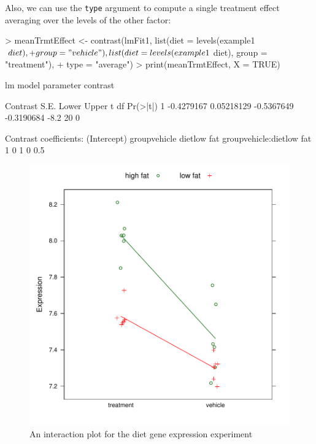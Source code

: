 \documentclass[12pt]{article}
\begin{document}
Also, we can use the \texttt{type} argument to compute a single treatment effect averaging over the levels of the other factor:

{\small
\begin{Schunk}
\begin{Sinput}
> meanTrmtEffect <- contrast(lmFit1, list(diet = levels(example1$diet), 
+     group = "vehicle"), list(diet = levels(example1$diet), group = "treatment"), 
+     type = "average")
> print(meanTrmtEffect, X = TRUE)
\end{Sinput}
\begin{Soutput}
lm model parameter contrast

    Contrast       S.E.      Lower      Upper    t df Pr(>|t|)
1 -0.4279167 0.05218129 -0.5367649 -0.3190684 -8.2 20        0

Contrast coefficients:
  (Intercept) groupvehicle dietlow fat groupvehicle:dietlow fat
1           0            1           0                      0.5
\end{Soutput}
\end{Schunk}
}

\begin{figure}[p]
   \begin{center}		
\includegraphics{contrast-example1Plot}
      \caption{An interaction plot for the diet gene expression experiment}
      \label{f:exp1}         
   \end{center}
\end{figure}
\end{document}
